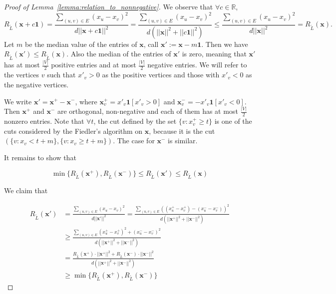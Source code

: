 \documentclass[a4paper]{article}
\theoremstyle{definition}
\begin{document}
\begin{proof}[Proof of Lemma~\ref{lemma:relation_to_nonnegative}]
\hfill

We observe that $\forall c\in\mathbb{R}$,
\begin{equation}
    R_{\tilde{L}}(\textbf{x}+c\textbf{1}) = \frac{\sum_{(u, v)\in E}(x_u-x_v)^2}{d||\textbf{x} + c\textbf{1}||^2} = \frac{\sum_{(u, v)\in E}(x_u-x_v)^2}{d(||\textbf{x}||^2+||c\textbf{1}||^2)} \leq \frac{\sum_{(u, v)\in E}(x_u-x_v)^2}{d||\textbf{x}||^2} = R_{\tilde{L}}(\textbf{x}).
\end{equation}
Let $m$ be the median value of the entries of $\textbf{x}$, call $\textbf{x}':=\textbf{x}-m\textbf{1}$. Then we have $R_{\tilde{L}}(\textbf{x}')\leq R_{\tilde{L}}(\textbf{x})$. Also the median of the entries of $\textbf{x}'$ is zero, meaning that $\textbf{x}'$ has at most $\frac{|V|}{2}$ positive entries and at most $\frac{|V|}{2}$ negative entries. We will refer to the vertices $v$ such that $x'_{v} > 0$ as the positive vertices and those with $x'_{v} < 0$ as the negative vertices.

We write $\textbf{x}'=\textbf{x}^{+} - \textbf{x}^{-}$, where $\textbf{x}^{+}_{v}=x'_v\textbf{1}[x'_v >0]$ and $\textbf{x}^{-}_{v}=-x'_{v}\textbf{1}[x'_v <0]$. Then $\textbf{x}^{+}$ and $\textbf{x}^{-}$ are orthogonal, non-negative and each of them has at most $\frac{|V|}{2}$ nonzero entries. Note that $\forall t$, the cut defined by the set $\{v:x_v^{+}\geq t\}$ is one of the cuts considered by the Fiedler's algorithm on $\textbf{x}$, because it is the cut $(\{v:x_v<t+m\}, \{v:x_v\geq t+m\})$. The case for $\textbf{x}^{-}$ is similar.

It remains to show that

\begin{equation}
    \min\{R_{\tilde{L}}(\textbf{x}^{+}), R_{\tilde{L}}(\textbf{x}^{-})\}\leq R_{\tilde{L}}(\textbf{x}') \leq R_{\tilde{L}}(\textbf{x})
\end{equation}

We claim that

\begin{align}
    R_{\tilde{L}}(\textbf{x}') &= \frac{\sum_{(u, v)\in E}(x_u-x_v)^2}{d||\textbf{x}'||^2} = \frac{\sum_{(u, v)\in E}((x_u^{+}-x_v^{+})-(x_u^{-}-x_v^{-}))^2}{d(||\textbf{x}^{+}||^2+||\textbf{x}^{-}||^2)}\\
    &\geq \frac{\sum_{(u, v)\in E}(x_u^{+}-x_v^{+})^2+(x_u^{-}-x_v^{-})^2}{d(||\textbf{x}^{+}||^2+||\textbf{x}^{-}||^2)}\\
    &= \frac{R_{\tilde{L}}(\textbf{x}^{+})\cdot ||\textbf{x}^{+}||^2 + R_{\tilde{L}}(\textbf{x}^{-})\cdot ||\textbf{x}^{-}||^2 }{d(||\textbf{x}^{+}||^2+||\textbf{x}^{-}||^2)}\\
    &\geq \min\{R_{\tilde{L}}(\textbf{x}^{+}), R_{\tilde{L}}(\textbf{x}^{-})\}
\end{align}


\end{proof}
\end{document}
